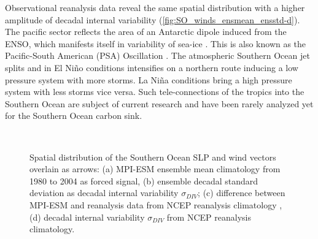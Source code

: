 Observational reanalysis data reveal the same spatial distribution with a higher amplitude of decadal internal variability (\autoref{fig:SO_winds_ensmean_ensstd-d}). The pacific sector reflects the area of an Antarctic dipole induced from the \ac{ENSO}, which manifests itself in variability of sea-ice \citep{Yuan2004}. This is also known as the Pacific-South American (PSA) Oscillation \citep{Sallee2008}. The atmospheric Southern Ocean jet splits and in El Ni\~{n}o conditions intensifies on a northern route  inducing a low pressure system with more storms. La Ni\~{n}a conditions bring a high pressure system with less storms vice versa. Such tele-connections of the tropics into the Southern Ocean are subject of current research and have been rarely analyzed yet for the Southern Ocean carbon sink.\newline


\begin{figure}[hbt]
        \\
       
        \caption{Spatial distribution of the Southern Ocean \acf{SLP} and wind vectors overlain as arrows: (a) \acs{MPI-ESM} ensemble mean climatology from 1980 to 2004 as forced signal, (b) ensemble decadal standard deviation as decadal internal variability $\sigma_{DIV}$; (c) difference between \acs{MPI-ESM} and reanalysis data from \acs{NCEP} reanalysis climatology \citep{Kalnay1996}, (d) decadal internal variability $\sigma_{DIV}$ from \acs{NCEP} reanalysis climatology.} \label{fig:SO_winds_ensmean_ensstd}
\end{figure}


